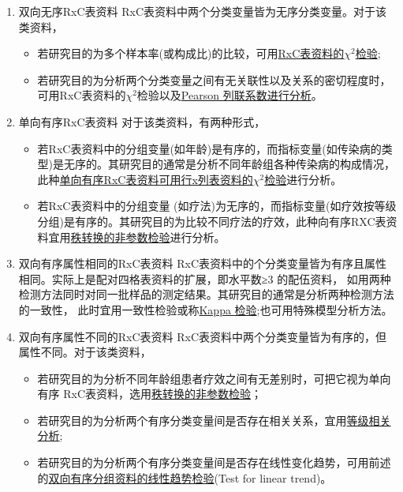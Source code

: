 \documentclass[
]{article}
\providecommand{\tightlist}{%
  \setlength{\itemsep}{0pt}\setlength{\parskip}{0pt}}
\begin{document}
\begin{enumerate}
\def\labelenumi{\arabic{enumi}.}
\item
  双向无序RxC表资料
  RxC表资料中两个分类变量皆为无序分类变量。对于该类资料，

  \begin{itemize}
  \tightlist
  \item
    若研究目的为多个样本率(或构成比)的比较，可用\protect\hyperlink{ux591aux4e2aux6837ux672cux7387ux7684ux6bd4ux8f83}{RxC表资料的\(\chi^2\)检验};
  \item
    若研究目的为分析两个分类变量之间有无关联性以及关系的密切程度时，可用RxC表资料的\(\chi^2\)检验以及\protect\hyperlink{ux53ccux5411ux65e0ux5e8fux5206ux7ec4ux8d44ux6599ux7684ux5173ux8054ux6027ux68c0ux9a8c}{Pearson 列联系数进行分析}。
  \end{itemize}
\item
  单向有序RxC表资料
  对于该类资料，有两种形式，

  \begin{itemize}
  \tightlist
  \item
    若RxC表资料中的分组变量(如年龄)是有序的，而指标变量(如传染病的类型)是无序的。其研究目的通常是分析不同年龄组各种传染病的构成情况，
    此种\protect\hyperlink{ux884cux5217ux8d44ux6599ux8868ux7684ux5361ux65b9ux68c0ux9a8c}{单向有序RxC表资料可用行x列表资料的\(\chi^2\)检验}进行分析。
  \item
    若RxC表资料中的分组变量 (如疗法)为无序的，而指标变量(如疗效按等级分组)是有序的。其研究目的为比较不同疗法的疗效，此种向有序RXC表资
    料宜用\protect\hyperlink{ux79e9ux8f6cux6362ux7684ux975eux53c2ux6570ux68c0ux9a8c}{秩转换的非参数检验}进行分析。
  \end{itemize}
\item
  双向有序属性相同的RxC表资料
  RxC表资料中的个分类变量皆为有序且属性相同。实际上是配对四格表资料的扩展，即水平数≥3 的配伍资料，
  如用两种检测方法同时对同一批样品的测定结果。其研究目的通常是分析两种检测方法的一致性，
  此时宜用一致性检验或称\href{https://en.wikipedia.org/wiki/Cohen\%27s_kappa}{Kappa 检验};也可用特殊模型分析方法。
\item
  双向有序属性不同的RxC表资料
  RxC表资料中两个分类变量皆为有序的，但属性不同。对于该类资料，

  \begin{itemize}
  \tightlist
  \item
    若研究目的为分析不同年龄组患者疗效之间有无差别时，可把它视为单向有序 RxC表资料，选用\protect\hyperlink{ux79e9ux8f6cux6362ux7684ux975eux53c2ux6570ux68c0ux9a8c}{秩转换的非参数检验}；
  \item
    若研究目的为分析两个有序分类变量间是否存在相关关系，宜用\protect\hyperlink{ux7b49ux7ea7ux76f8ux5173ux5206ux6790}{等级相关分析};
  \item
    若研究目的为分析两个有序分类变量间是否存在线性变化趋势，可用前述的\protect\hyperlink{ux53ccux5411ux6709ux5e8fux5206ux7ec4ux8d44ux6599ux7684ux7ebfux6027ux8d8bux52bfux68c0ux9a8c}{双向有序分组资料的线性趋势检验}(Test for linear trend)。
  \end{itemize}
\end{enumerate}
\end{document}
